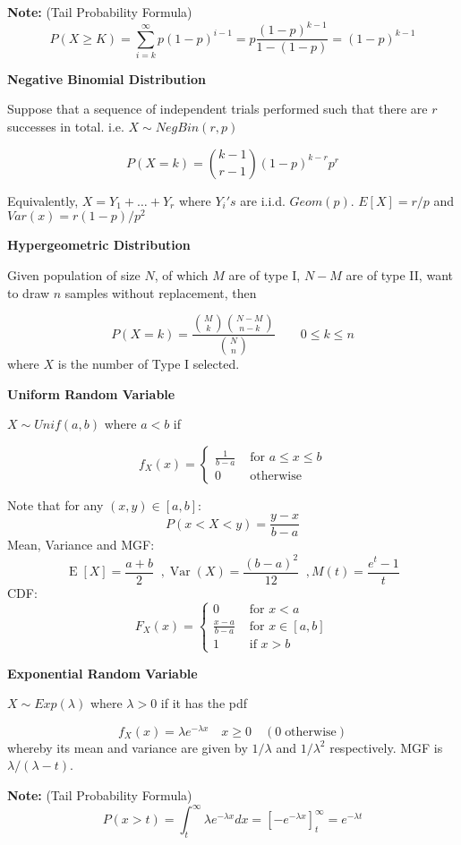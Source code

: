 \documentclass[a4paper]{article}
\newcommand{\subheading}[1]{{\scriptsize\textbf{#1}}}
\newcommand{\expectation}[1]{\operatorname{E}[#1]}
\DeclareMathOperator{\Var}{Var}
\begin{document}
\begin{multicols*}{4}
\textbf{Note: } (Tail Probability Formula)
$$
P(X\geq K) = \sum_{i=k}^{\infty}p(1-p)^{i-1} = p\frac{(1-p)^{k-1}}{1-(1-p)} = (1-p)^{k-1}
$$

\subheading{Negative Binomial Distribution}

Suppose that a sequence of independent trials performed such that there are $r$ successes in total. i.e.  $X\sim NegBin(r,p)$

$$
P(X=k) = \binom{k-1}{r-1} (1-p)^{k-r}p^r
$$

Equivalently, $X = Y_1 + \dots + Y_r$ where $Y_i's$ are i.i.d. $Geom(p)$.  $E[X] = r/p$ and $Var(x) = r(1-p)/p^2$
\smallskip

\subheading{Hypergeometric Distribution}

Given population of size $N$, of which $M$ are of type I, $N-M$ are of type II, want to draw $n$ samples without replacement, then

$$
P(X=k) = \frac{\binom{M}{k} \binom{N-M}{n-k}}{\binom{N}{n}} \quad \quad  0 \leq k \leq n
$$
where $X$ is the number of Type I selected. 
\smallskip

\subheading{Uniform Random Variable}

$X \sim Unif(a,b)$ where $a<b$ if

$$f_X(x) = \begin{cases}
  \frac{1}{b-a} & \text{ for $a \leq x \leq b$} \\
  0   & \text{ otherwise}
\end{cases}$$

Note that for any $(x,y)\in [a,b]$:
$$
P(x < X < y) = \frac{y-x}{b-a}
$$
Mean, Variance and MGF:
$$
\expectation{X} = \frac{a+b}{2} \;\;, \Var(X) = \frac{(b-a)^2}{12} \;\;, M(t) = \frac{e^t-1}{t}
$$
CDF:
$$F_X(x) = \begin{cases}
  0   & \text{ for $x<a$} \\
  \frac{x-a}{b-a} & \text{ for $x \in [a,b]$} \\
  1   & \text{ if $x>b$}
\end{cases}$$


\subheading{Exponential Random Variable}

$X\sim Exp(\lambda)$ where $\lambda > 0$ if it has the pdf

$$
f_X(x) = \lambda e^{-\lambda x} \quad x \geq 0 \quad (0 \;  \text{otherwise})
$$
whereby its mean and variance are given by $1/\lambda$ and $1/\lambda^2$ respectively. MGF is $\lambda/(\lambda-t)$.

\textbf{Note: } (Tail Probability Formula)
$$
P(x>t) = \int_t^\infty \lambda e^{-\lambda x} dx = \left[-e^{-\lambda x}\right]_t^\infty = e^{-\lambda t}
$$


\end{multicols*}
\end{document}
